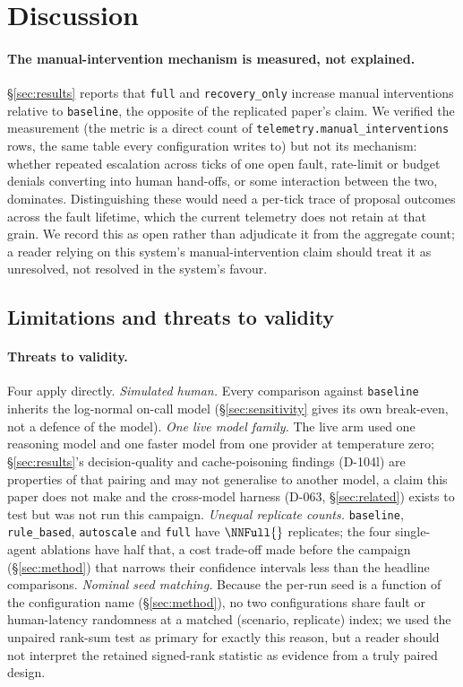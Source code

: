 \section{Discussion}\label{sec:discussion}

\paragraph{The manual-intervention mechanism is measured, not explained.}
\S\ref{sec:results} reports that \texttt{full} and \texttt{recovery\_only} increase manual
interventions relative to \texttt{baseline}, the opposite of the replicated paper's claim. We
verified the measurement (the metric is a direct count of
\texttt{telemetry.\allowbreak manual\_interventions} rows, the same table every configuration writes
to) but not its mechanism: whether repeated
escalation across ticks of one open fault, rate-limit or budget denials converting into
human hand-offs, or some interaction between the two, dominates. Distinguishing these would need a
per-tick trace of proposal outcomes across the fault lifetime, which the current telemetry does not
retain at that grain. We record this as open rather than adjudicate it from the aggregate count; a
reader relying on this system's manual-intervention claim should treat it as unresolved, not resolved
in the system's favour.

\subsection{Limitations and threats to validity}\label{sec:limitations}

\paragraph{Threats to validity.}
Four apply directly. \emph{Simulated human.} Every comparison against \texttt{baseline} inherits the
log-normal on-call model (\S\ref{sec:sensitivity} gives its own break-even, not a defence of the
model). \emph{One live model family.} The live arm used one reasoning model and one faster model from
one provider at temperature zero; \S\ref{sec:results}'s decision-quality and cache-poisoning findings
(D-104l) are properties of that pairing and may not generalise to another model, a claim this paper
does not make and the cross-model harness (D-063, \S\ref{sec:related}) exists to test but was not run
this campaign. \emph{Unequal replicate counts.} \texttt{baseline}, \texttt{rule\_based},
\texttt{autoscale} and \texttt{full} have $\NNFull{}$ replicates; the four single-agent ablations have
half that, a cost trade-off made before the campaign (\S\ref{sec:method}) that narrows their
confidence intervals less than the headline comparisons. \emph{Nominal seed matching.} Because the
per-run seed is a function of the configuration name (\S\ref{sec:method}), no two configurations share
fault or human-latency randomness at a matched (scenario, replicate) index; we used the unpaired
rank-sum test as primary for exactly this reason, but a reader should not interpret the retained
signed-rank statistic as evidence from a truly paired design.

